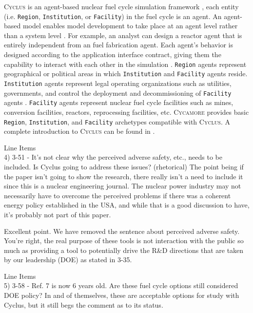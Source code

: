 \documentclass[answers,11pt]{exam}
\newcommand{\Cyclus}{\textsc{Cyclus}\xspace}%
\newcommand{\Cycamore}{\textsc{Cycamore}\xspace}%
\begin{document}
\begin{questions}
\begin{solution}
\Cyclus is an agent-based nuclear fuel cycle simulation framework 
\cite{huff_fundamental_2016}, 
each entity (i.e. \texttt{Region}, \texttt{Institution}, or \texttt{Facility}) in the 
fuel cycle is an agent. 
An agent-based model enables model development to take place at an agent level 
rather than a system level \cite{huff_fundamental_2016}. 
For example, an analyst can design a reactor agent that is entirely independent 
from an fuel fabrication agent. Each agent's behavior is designed according to the 
application interface contract, giving them the capability to interact with each 
other in the simulation \cite{huff_fundamental_2016}.  
\texttt{Region} agents represent geographical or political areas in which \texttt{Institution}
and \texttt{Facility} agents reside. 
\texttt{Institution} agents represent legal operating organizations such as
utilities, governments, and control the 
deployment and decommissioning of \texttt{Facility} agents
\cite{huff_fundamental_2016}.
\texttt{Facility} agents represent nuclear fuel cycle facilities
such as mines, conversion facilities, reactors, reprocessing facilities, 
etc. 
\Cycamore \cite{carlsen_cycamore_2014}
provides basic \texttt{Region}, \texttt{Institution}, 
and \texttt{Facility} archetypes compatible with \Cyclus. 
A complete introduction to \Cyclus can be found in \cite{huff_fundamental_2016}. 
\end{solution}

\question Line Items \\
4) 3-51 - It’s not clear why the perceived adverse safety, etc., needs to be included. Is Cyclus going
to address these issues? (rhetorical) The point being if the paper isn’t going to show the research,
there really isn’t a need to include it since this is a nuclear engineering journal. The nuclear power
industry may not necessarily have to overcome the perceived problems if there was a coherent energy
policy established in the USA, and while that is a good discussion to have, it’s probably not part of
this paper.

\begin{solution}
Excellent point. We have removed the sentence about perceived adverse safety. You're right, the real purpose 
of these tools is not interaction with the public so much as providing a tool to potentially drive the 
R\&D directions that are taken by our leadership (DOE) as stated in 3-35. 
\end{solution}

\question Line Items \\
5) 3-58 - Ref. 7 is now 6 years old. Are these fuel cycle options still considered DOE policy? In and of
themselves, these are acceptable options for study with Cyclus, but it still begs the comment as to its
status.


\end{questions}
\end{document}

